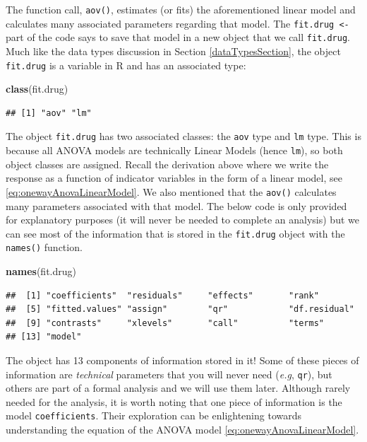 \documentclass[
]{book}
\newenvironment{Shaded}{\begin{snugshade}}{\end{snugshade}}
\newcommand{\FunctionTok}[1]{\textcolor[rgb]{0.13,0.29,0.53}{\textbf{#1}}}
\newcommand{\NormalTok}[1]{#1}
\begin{document}
The function call, \texttt{aov()}, estimates (or fits) the aforementioned linear model and calculates many associated parameters regarding that model.
The \texttt{fit.drug\ \textless{}-} part of the code says to save that model in a new object that we call \texttt{fit.drug}.
Much like the data types discussion in Section \ref{dataTypesSection}, the object \texttt{fit.drug} is a variable in R and has an associated type:

\begin{Shaded}
\begin{Highlighting}[]
\FunctionTok{class}\NormalTok{(fit.drug)}
\end{Highlighting}
\end{Shaded}

\begin{verbatim}
## [1] "aov" "lm"
\end{verbatim}

The object \texttt{fit.drug} has two associated classes: the \texttt{aov} type and \texttt{lm} type.
This is because all ANOVA models are technically Linear Models (hence \texttt{lm}), so both object classes are assigned.
Recall the derivation above where we write the response as a function of indicator variables in the form of a linear model, see \eqref{eq:onewayAnovaLinearModel}.
We also mentioned that the \texttt{aov()} calculates many parameters associated with that model.
The below code is only provided for explanatory purposes (it will never be needed to complete an analysis) but we can see most of the information that is stored in the \texttt{fit.drug} object with the \texttt{names()} function.

\begin{Shaded}
\begin{Highlighting}[]
\FunctionTok{names}\NormalTok{(fit.drug)}
\end{Highlighting}
\end{Shaded}

\begin{verbatim}
##  [1] "coefficients"  "residuals"     "effects"       "rank"         
##  [5] "fitted.values" "assign"        "qr"            "df.residual"  
##  [9] "contrasts"     "xlevels"       "call"          "terms"        
## [13] "model"
\end{verbatim}

The object has 13 components of information stored in it!
Some of these pieces of information are \emph{technical} parameters that you will never need (\emph{e.g}, \texttt{qr}), but others are part of a formal analysis and we will use them later.
Although rarely needed for the analysis, it is worth noting that one piece of information is the model \texttt{coefficients}.
Their exploration can be enlightening towards understanding the equation of the ANOVA model \eqref{eq:onewayAnovaLinearModel}.
\end{document}
